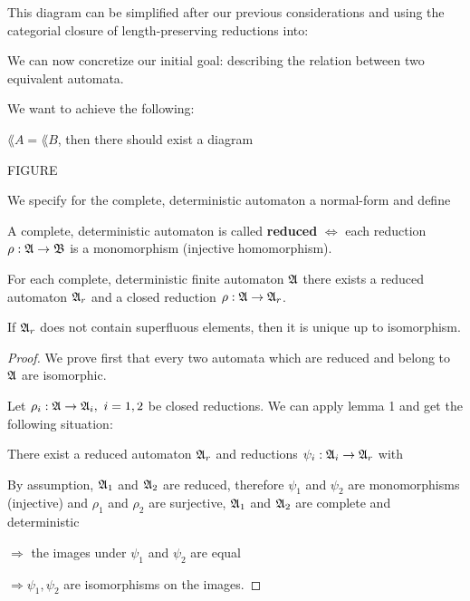 This diagram can be simplified after our previous considerations and using the
categorial closure of length-preserving reductions into:

\begin{center}
\end{center}

We can now concretize our initial goal: describing the relation between
two equivalent automata.

We want to achieve the following:

$\lang{A} = \lang{B}$, then there should exist a diagram

FIGURE

We specify for the complete, deterministic automaton a normal-form and define

\begin{definition}
A complete, deterministic automaton is called {\bf reduced} $\iff$ each
reduction $\rho : \mbox{$\mathfrak{A}$} \to \mbox{$\mathfrak{B}$}$ is a monomorphism (injective homomorphism).
\end{definition}

\begin{lemma}
For each complete, deterministic finite automaton $\mbox{$\mathfrak{A}$}$ there exists a
reduced automaton $\mbox{$\mathfrak{A}$}_r$ and a closed reduction $\rho : \mbox{$\mathfrak{A}$} \to
\mbox{$\mathfrak{A}$}_r$.

If $\mbox{$\mathfrak{A}$}_r$ does not contain superfluous elements, then it is unique up to
isomorphism.
\end{lemma}

\begin{proof}
We prove first that every two automata which are reduced and belong to $\mbox{$\mathfrak{A}$}$
are isomorphic.

Let $\rho_i : \mbox{$\mathfrak{A}$} \to \mbox{$\mathfrak{A}$}_i,\ i = 1, 2$ be closed reductions. We can apply
lemma 1 and get the following situation:

There exist a reduced automaton $\mbox{$\mathfrak{A}$}_r$ and reductions $\psi_i : \mbox{$\mathfrak{A}$}_i
\to \mbox{$\mathfrak{A}$}_r$ with

\begin{center}
\end{center}

By assumption, $\mbox{$\mathfrak{A}$}_1$ and $\mbox{$\mathfrak{A}$}_2$ are reduced, therefore $\psi_1$ and
$\psi_2$ are monomorphisms (injective) and $\rho_1$ and $\rho_2$ are surjective,
$\mbox{$\mathfrak{A}$}_1$ and $\mbox{$\mathfrak{A}$}_2$	are complete and deterministic

$\Rightarrow$ the images under $\psi_1$ and $\psi_2$ are equal

$\Rightarrow \psi_1, \psi_2$ are isomorphisms on the images. 
\end{proof}

